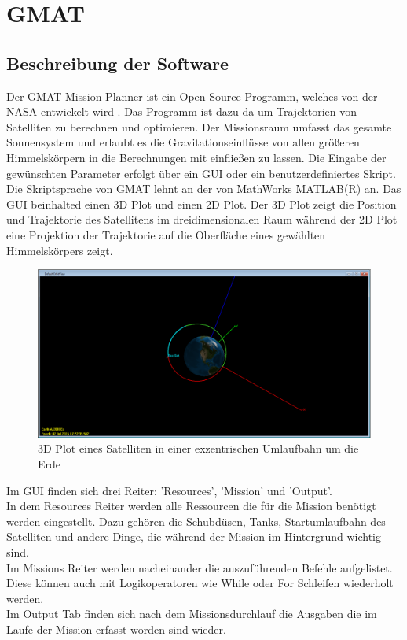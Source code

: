 			
\section{GMAT}
		\subsection{Beschreibung der Software}
		Der GMAT Mission Planner ist ein Open Source Programm, welches von der NASA entwickelt wird \cite{GMAT}. Das Programm ist dazu da um Trajektorien von Satelliten zu berechnen und optimieren. Der Missionsraum umfasst das gesamte Sonnensystem und erlaubt es die Gravitationseinflüsse von allen größeren Himmelskörpern in die Berechnungen mit einfließen zu lassen. 
Die Eingabe der gewünschten Parameter erfolgt über ein GUI oder ein benutzerdefiniertes Skript. Die Skriptsprache von GMAT lehnt an der von MathWorks MATLAB(R) an.
Das GUI beinhalted einen 3D Plot und einen 2D Plot. Der 3D Plot zeigt die Position und Trajektorie des Satellitens im dreidimensionalen Raum während der 2D Plot eine Projektion der Trajektorie auf die Oberfläche eines gewählten Himmelskörpers zeigt.

\begin{figure}[!h]
	\centering
		\includegraphics[width=1.00\textwidth]{graphics/GMAT/GMAT_OrbitView2.PNG}
	\caption{3D Plot eines Satelliten in einer exzentrischen Umlaufbahn um die Erde}
	\label{fig:OrbitView2}
\end{figure}


Im GUI finden sich drei Reiter: ’Resources’, ’Mission’ und ’Output’.\\
In dem Resources Reiter werden alle Ressourcen die für die Mission benötigt werden eingestellt. Dazu gehören die Schubdüsen, Tanks, Startumlaufbahn des Satelliten und andere Dinge, die während der Mission im Hintergrund wichtig sind.\\
Im Missions Reiter werden nacheinander die auszuführenden Befehle aufgelistet. Diese können auch mit Logikoperatoren wie While oder For Schleifen wiederholt werden.\\
Im Output Tab finden sich nach dem Missionsdurchlauf die Ausgaben die im Laufe der Mission erfasst worden sind wieder. 


